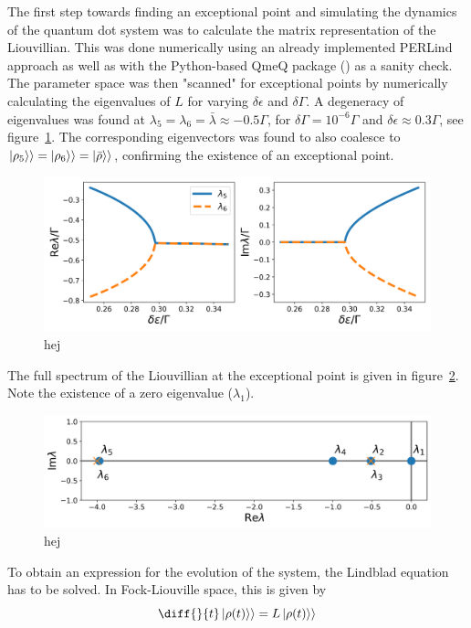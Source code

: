 \documentclass[../main.tex]{subfiles}
\begin{document}
The first step towards finding an exceptional point and simulating the dynamics of the quantum dot system was to calculate the matrix representation of the Liouvillian. This was done numerically using an already implemented PERLind approach as well as with the Python-based QmeQ package (\cite{qmeq}) as a sanity check. The parameter space was then "scanned" for exceptional points by numerically calculating the eigenvalues of $L$ for varying $\delta\epsilon$ and $\delta\Gamma$. A degeneracy of eigenvalues was found at $\lambda_5 = \lambda_6 = \bar\lambda \approx -0.5\Gamma$, for $\delta\Gamma = 10^{-6}\Gamma$ and $\delta\epsilon \approx 0.3\Gamma$, see figure~\ref{fig:tuning}. The corresponding eigenvectors was found to also coalesce to $\ket{\rho_5}\rangle = \ket{\rho_6}\rangle = \ket{\bar \rho}\rangle$, confirming the existence of an exceptional point.
\begin{figure}[H]
    \centering
    \includegraphics[width=0.9\linewidth]{figures/tuning.png}
    \caption{hej}
    \label{fig:tuning}
\end{figure}

The full spectrum of the Liouvillian at the exceptional point is given in figure~\ref{fig:spec}. Note the existence of a zero eigenvalue ($\lambda_1$).

\begin{figure}[H]
    \centering
    \includegraphics[width=0.8\linewidth]{figures/spectrum.png}
    \caption{hej}
    \label{fig:spec}
\end{figure}


To obtain an expression for the evolution of the system, the Lindblad equation has to be solved. In Fock-Liouville space, this is given by 
\begin{equation}
    \diff{}{t}\ket{\rho(t)}\rangle = L \ket{\rho(t)}\rangle
\end{equation}
\end{document}

